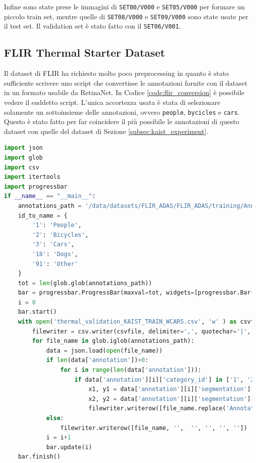 Infine sono state prese le immagini di \texttt{SET00/V000} e \texttt{SET05/V000} per formare un piccolo train set, mentre quelle di \texttt{SET08/V000} e \texttt{SET09/V000} sono state usate per il test set. Il validation set è stato fatto con il \texttt{SET06/V001}. 

\subsection{FLIR Thermal Starter Dataset}
\label{subsec:flir_experiment}
Il dataset di FLIR ha richiesto molto poco preprocessing in quanto è stato sufficiente scrivere uno script che convertisse le annotazioni fornite con il dataset in un formato usabile da RetinaNet. In Codice \ref{code:flir_conversion} è possibile vedere il suddetto script. L'unica accortezza usata è stata di selezionare solamente un sottoinsieme delle annotazioni, ovvero \texttt{people}, \texttt{bycicles} e \texttt{cars}. Questo è stato fatto per far coincidere il più possibile le annotazioni di questo dataset con quelle del dataset di Sezione \ref{subsec:kaist_experiment}.

\begin{lstlisting}[caption={Script di conversione per dataset FLIR}, language=Python, basicstyle=\tiny,label=code:flir_conversion]
import json
import glob
import csv
import itertools
import progressbar
if __name__ == "__main__":
    annotations_path = '/data/datasets/FLIR_ADAS/FLIR_ADAS/training/Annotations/*.json'
    id_to_name = {
        '1': 'People',
        '2': 'Bicycles',
        '3': 'Cars',
        '18': 'Dogs',
        '91': 'Other'
    }
    tot = len(glob.glob(annotations_path))
    bar = progressbar.ProgressBar(maxval=tot, widgets=[progressbar.Bar('=', '[', ']'), ' ', progressbar.Percentage()])
    i = 0
    bar.start()
    with open('thermal_validation_KAIST_TRAIN_WCARS.csv', 'w' ) as csvfile:
        filewriter = csv.writer(csvfile, delimiter=',', quotechar='|', quoting=csv.QUOTE_MINIMAL)
        for file_name in glob.iglob(annotations_path):
            data = json.load(open(file_name))
            if len(data['annotation'])>0:
                for i in range(len(data['annotation'])):
                    if data['annotation'][i]['category_id'] in ['1', '2', '3']:
                        x1, y1 = data['annotation'][i]['segmentation'][0][0],data['annotation'][i]['segmentation'][0][1]
                        x2, y2 = data['annotation'][i]['segmentation'][0][4],data['annotation'][i]['segmentation'][0][5]
                        filewriter.writerow([file_name.replace('Annotations', 'PreviewData')]+[x1, y1, x2, y2]+[id_to_name[data['annotation'][i]['category_id']]])
            else:
                filewriter.writerow([file_name, '',  '', '', '', ''])
            i = i+1
            bar.update(i)
    bar.finish()
  
\end{lstlisting}

